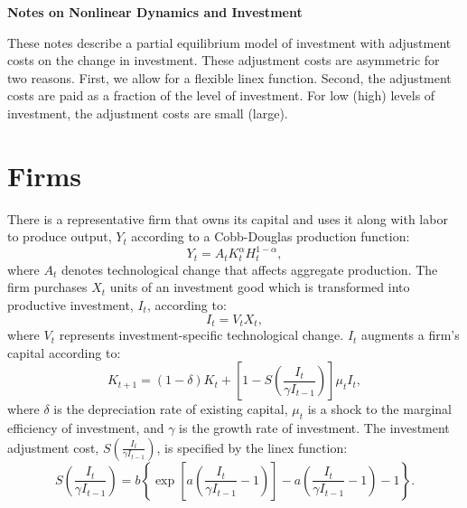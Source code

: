 \documentclass[11pt,fleqn]{article}
\begin{document}
\doublespacing

\begin{center}
\textbf{\Large Notes on Nonlinear Dynamics and Investment}
\end{center}

These notes describe a partial equilibrium model of investment with adjustment costs on the change in investment.  These adjustment costs are asymmetric for two reasons.  First, we allow for a flexible linex function.  Second, the adjustment costs are paid as a fraction of the level of investment.  For low (high) levels of investment, the adjustment costs are small (large). 

\section{Firms}

There is a representative firm that owns its capital and uses it along with labor to produce output, $Y_t$ according to a Cobb-Douglas production function:
\begin{equation}
Y_t = A_t K^{\alpha}_t H^{1-\alpha}_t,  \label{production_function}
\end{equation}
where $A_t$ denotes technological change that affects aggregate production.
The firm purchases $X_t$ units of an investment good which is transformed into productive investment, $I_t$, according to:
\begin{equation}
I_t = V_t X_t, \label{inv_production}
\end{equation}
where $V_t$ represents investment-specific technological change. $I_t$ augments a firm's capital according to:
\begin{equation} 
K_{t+1} = (1-\delta) K_t +\left[1-  S\left(\frac{I_t}{\gamma I_{t-1}}\right) \right] \mu_t I_t,  \label{capital_accumulation}
\end{equation}
where $\delta$ is the depreciation rate of existing capital, $\mu_t$ is a shock to the marginal efficiency of investment, and $\gamma$ is the growth rate of investment.  The investment adjustment cost, $S\left(\frac{I_t}{\gamma I_{t-1}}\right)$, is specified by the linex function:
\begin{equation}
S\left(\frac{I_t}{ \gamma I_{t-1}}\right) =  b \left\{\exp \left[ a \left(\frac{I_t}{\gamma I_{t-1}}-1\right)\right]-a\left(\frac{I_t}{ \gamma I_{t-1}}-1\right)-1\right\}.
\end{equation}
\end{document}
